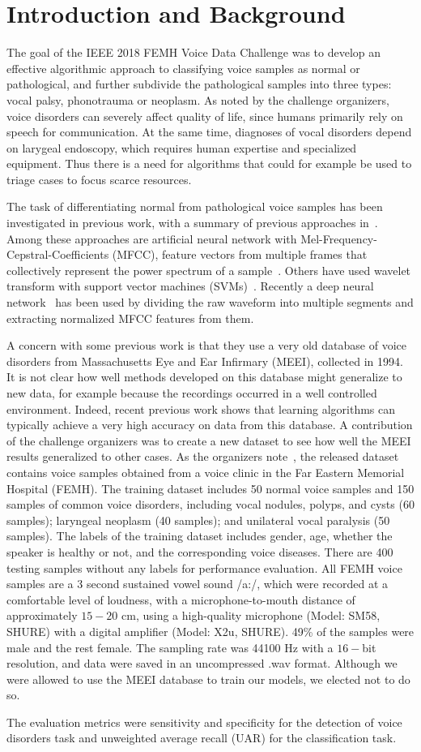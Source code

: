 \section{Introduction and Background}
The goal of the IEEE 2018 FEMH Voice Data Challenge was to develop an effective algorithmic approach to classifying voice samples as normal or pathological, and further subdivide the pathological samples into three types: vocal palsy, phonotrauma or neoplasm. As noted by the challenge organizers, voice disorders can severely affect quality of life, since humans primarily rely on speech for communication. At the same time, diagnoses of vocal disorders depend on larygeal endoscopy, which requires human expertise and specialized equipment. Thus there is a need for algorithms that could for example be used to triage cases to focus scarce resources.

The task of differentiating normal from pathological voice samples has been investigated in previous work, with a summary of previous approaches in~\cite{b9}. Among these approaches are artificial neural network with Mel-Frequency-Cepstral-Coefficients (MFCC), feature vectors from multiple frames that collectively represent the power spectrum of a sample~\cite{b5}. Others have used wavelet transform with support vector machines (SVMs)~\cite{b4}. Recently a deep neural network~\cite{b9} has been used by dividing the raw waveform into multiple segments and extracting normalized MFCC features from them.

A concern with some previous work is that they use a very old database of voice disorders from Massachusetts Eye and Ear Infirmary (MEEI), collected in 1994. It is not clear how well methods developed on this database might generalize to new data, for example because the recordings occurred in a well controlled environment. Indeed, recent previous work shows that learning algorithms can typically achieve a very high accuracy on data from this database. A contribution of the challenge organizers was to create a new dataset to see how well the MEEI results generalized to other cases. As the organizers note~\cite{b16}, the released dataset contains voice samples obtained from a voice clinic in the Far Eastern Memorial Hospital (FEMH). The training dataset includes 50 normal voice samples and 150 samples of common voice disorders, including vocal nodules, polyps, and cysts (60 samples); laryngeal neoplasm (40 samples); and unilateral vocal paralysis (50 samples). The labels of the training dataset includes gender, age, whether the speaker is healthy or not, and the corresponding voice diseases. There are 400 testing samples without any labels for performance evaluation. All FEMH voice samples are a 3 second sustained vowel sound /a:/, which were recorded at a comfortable level of loudness, with a microphone-to-mouth distance of approximately $15-20$ cm, using a high-quality microphone (Model: SM58, SHURE) with a digital amplifier (Model: X2u, SHURE). 49\% of the samples were male and the rest female. The sampling rate was 44100 Hz with a $16-$bit resolution, and data were saved in an uncompressed .wav format. Although we were allowed to use the MEEI database to train our models, we elected not to do so.

The evaluation metrics were sensitivity and specificity for the detection of voice disorders task and unweighted average recall (UAR) for the classification task.
